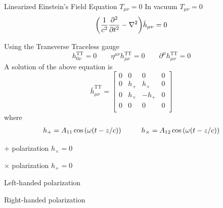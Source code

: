 \documentclass{beamer}
\newcommand{\bea}{\setlength{\jot}{10pt}\begin{eqnarray*}}
\newcommand{\eea}{\end{eqnarray*}}
\theoremstyle{definition}
\theoremstyle{plain}
\begin{document}
\begin{frame}{Linearized Einstein's Field Equation $T_{\mu \nu} =0$}
In vacuum $T_{\mu \nu}=0$
\[
\qty(
\dfrac{1}{c^{2}}
\pdv[2]{}{t}
-
\nabla ^{2}
)
\bar{h} _{\mu \nu} =0
\]

Using the Transverse Traceless gauge
\[
h^{\text{TT}}_{0 \nu} = 0 \qquad
\eta ^{\mu \nu } h^{\text{TT}}_{\mu \nu} =0
\qquad
\partial^{\mu} h^{\text{TT}} _{\mu \nu}=0
\]
A solution of the above equation is
\[
\bar{h}^{\text{TT}}_{\mu \nu} =
\begin{bmatrix}
0 & 0 & 0 & 0 \\
0 & h_{+} & h_{\times} & 0 \\
0 & h_{\times} & -h_{+} & 0 \\
0 & 0 & 0 & 0 \\
\end{bmatrix}
\]
where 
\bea
h_{+} = A _{11} \cos \qty(\omega(t-z/c)) \hspace{1cm}
h_{\times} =  A _{12} \cos \qty(\omega(t-z/c))
\eea
\end{frame}


\begin{frame}{$+$ polarization $h_{\times}=0$}
	\begin{figure}
    \centering
    \end{figure}
\end{frame}

\begin{frame}{$\times$ polarization $h_{+}=0$}
	\begin{figure}
    \centering
    \end{figure}
\end{frame}

\begin{frame}{Left-handed polarization}
	\begin{figure}
    \centering
    \end{figure}
\end{frame}

\begin{frame}{Right-handed polarization}
	\begin{figure}
    \centering
    \end{figure}
\end{frame}
\end{document}
